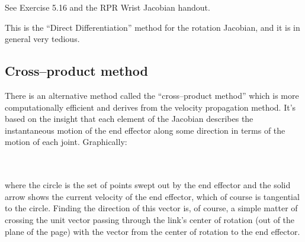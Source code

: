 \documentclass[]{article}
\begin{document}
See Exercise 5.16 and the RPR Wrist Jacobian handout.

This is the ``Direct Differentiation'' method for the rotation Jacobian, and it is in general very tedious.

\subsection{Cross--product method}
There is an alternative method called the ``cross--product method'' which is more computationally efficient and derives from the velocity propagation method. It's based on the insight that each element of the Jacobian describes the instantaneous motion of the end effector along some direction in terms of the motion of each joint. Graphically:

\\
\\

where the circle is the set of points swept out by the end effector and the solid arrow shows the current velocity of the end effector, which of course is tangential to the circle. Finding the direction of this vector is, of course, a simple matter of crossing the unit vector passing through the link's center of rotation (out of the plane of the page) with the vector from the center of rotation to the end effector.
\end{document}
